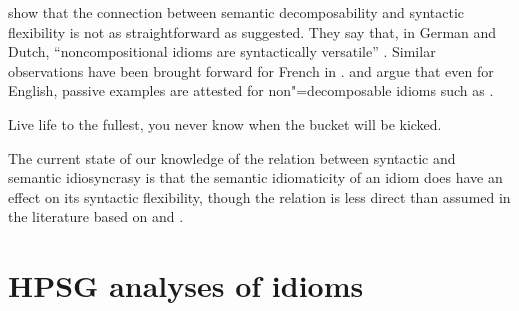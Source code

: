 \documentclass[output=paper
                ,modfonts
                ,nonflat
	        ,collection
	        ,collectionchapter
	        ,collectiontoclongg
 	        ,biblatex
                ,babelshorthands
                ,newtxmath
                ,draftmode
                ,colorlinks, citecolor=brown
]{./langsci/langscibook}
\begin{document}



\citet[511--514]{NSW94a} show that the connection between semantic decomposability and syntactic flexibility is not as straightforward as suggested. They say that, in German and Dutch, ``noncompositional idioms  are syntactically versatile'' \citep[514]{NSW94a}. Similar observations have been brought forward for French in \citet{Ruwet:91}. 
\citet{Bargmann:Sailer:18} and \cite{Fellbaum:19} argue that even for English, passive examples are attested for non"=decomposable idioms such as .

\ea 
Live life to the fullest, you never know when the bucket will be kicked. \citep[756]{Fellbaum:19}\label{ex-kick-fellbaum}
\z 

The current state of our knowledge of the relation between syntactic and semantic idiosyncrasy is that the semantic idiomaticity of an idiom does have an effect on its syntactic flexibility, though the relation is less direct than assumed in the literature based on \cite{WSN84a-u} and \cite{NSW94a}.


\section{HPSG analyses of idioms}
\label{Sec-Analyses}


\end{document}
